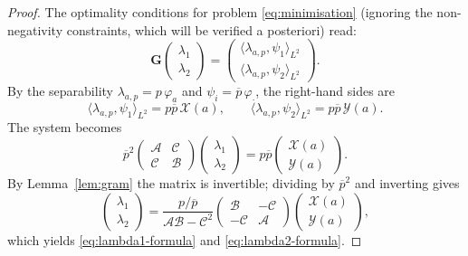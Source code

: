 \documentclass[10pt,a4paper]{amsart}
\begin{document}
\begin{proof}
The optimality conditions for problem \eqref{eq:minimisation} (ignoring the
non-negativity constraints, which will be verified a posteriori) read:
\[
\mathbf{G}\begin{pmatrix}\lambda_1\\ \lambda_2\end{pmatrix}
=
\begin{pmatrix}
\langle\lambda_{a,p},\psi_1\rangle_{L^2}\\
\langle\lambda_{a,p},\psi_2\rangle_{L^2}
\end{pmatrix}.
\]
By the separability $\lambda_{a,p}=p\,\varphi_a$ and $\psi_i=\overline{p}\,\varphi_{\cdot}$,
the right-hand sides are
\[
\langle\lambda_{a,p},\psi_1\rangle_{L^2}=p\overline{p}\,\mathcal{X}(a),
\qquad
\langle\lambda_{a,p},\psi_2\rangle_{L^2}=p\overline{p}\,\mathcal{Y}(a).
\]
The system becomes
\[
\overline{p}^2
\begin{pmatrix}\mathcal{A} & \mathcal{C}\\ \mathcal{C} & \mathcal{B}\end{pmatrix}
\begin{pmatrix}\lambda_1\\ \lambda_2\end{pmatrix}
=
p\overline{p}
\begin{pmatrix}\mathcal{X}(a)\\ \mathcal{Y}(a)\end{pmatrix}.
\]
By Lemma~\ref{lem:gram} the matrix is invertible; dividing by $\overline{p}^2$
and inverting gives
\[
\begin{pmatrix}\lambda_1\\ \lambda_2\end{pmatrix}
=
\frac{p/\overline{p}}{\mathcal{A}\mathcal{B}-\mathcal{C}^2}
\begin{pmatrix}
\mathcal{B} & -\mathcal{C}\\
-\mathcal{C} & \mathcal{A}
\end{pmatrix}
\begin{pmatrix}\mathcal{X}(a)\\ \mathcal{Y}(a)\end{pmatrix},
\]
which yields \eqref{eq:lambda1-formula} and \eqref{eq:lambda2-formula}.


\end{proof}
\end{document}
